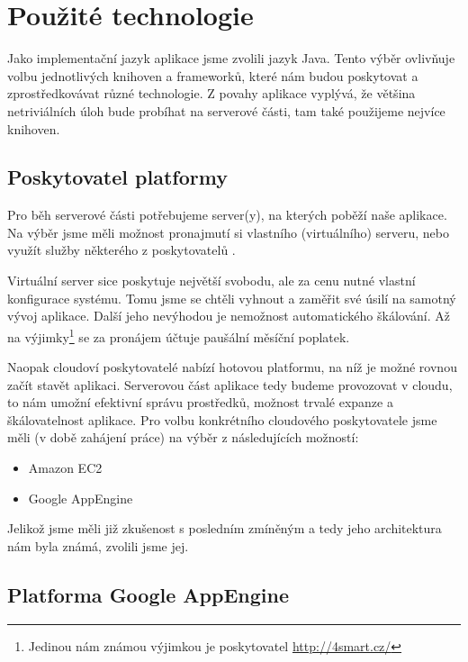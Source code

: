 \chapter{Použité technologie}

Jako implementační jazyk aplikace jsme zvolili jazyk Java.
Tento výběr ovlivňuje volbu jednotlivých knihoven a frameworků, které nám budou poskytovat a zprostředkovávat různé technologie.
Z povahy aplikace vyplývá, že většina netriviálních úloh bude probíhat na serverové části, tam také použijeme nejvíce knihoven.

\section{Poskytovatel platformy}
Pro běh serverové části potřebujeme server(y), na kterých poběží naše aplikace.
Na výběr jsme měli možnost pronajmutí si vlastního (virtuálního) serveru, nebo využít služby některého z poskytovatelů .

Virtuální server sice poskytuje největší svobodu, ale za cenu nutné vlastní konfigurace systému.
Tomu jsme se chtěli vyhnout a zaměřit své úsilí na samotný vývoj aplikace.
Další jeho nevýhodou je nemožnost automatického škálování.
Až na výjimky\footnote{Jedinou nám známou výjimkou je poskytovatel \url{http://4smart.cz/}} se za pronájem účtuje paušální měsíční poplatek.

Naopak cloudoví poskytovatelé nabízí hotovou platformu, na níž je možné rovnou začít stavět aplikaci.
Serverovou část aplikace tedy budeme provozovat v cloudu, to nám umožní efektivní správu prostředků, možnost trvalé expanze a škálovatelnost aplikace.
Pro volbu konkrétního cloudového poskytovatele jsme měli (v době zahájení práce) na výběr z následujících možností:
\begin{itemize}
    \item Amazon EC2
    \item Google AppEngine
\end{itemize}

Jelikož jsme měli již zkušenost s posledním zmíněným a tedy jeho architektura nám byla známá, zvolili jsme jej.

\section{Platforma Google AppEngine}

